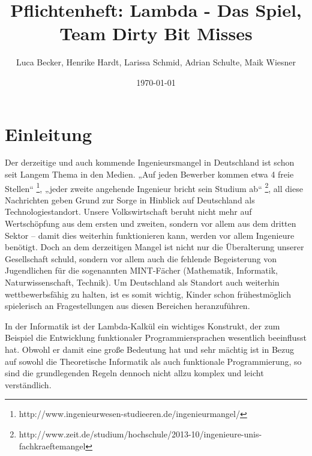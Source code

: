 \documentclass{scrartcl}
\begin{document}
\begin{titlepage}

\title{Pflichtenheft: Lambda - Das Spiel, Team Dirty Bit Misses}
\author{Luca Becker, Henrike Hardt, Larissa Schmid, Adrian Schulte, Maik Wiesner}
\date{\today}

\maketitle
\thispagestyle{empty}

\end{titlepage}

\clearpage

\tableofcontents
\thispagestyle{empty}

\clearpage
\setcounter{page}{1}

\section{Einleitung}

Der derzeitige und auch kommende Ingenieursmangel in Deutschland ist
schon seit Langem Thema in den Medien. „Auf jeden Bewerber kommen
etwa 4 freie Stellen“%
\footnote{http://www.ingenieurwesen-studieeren.de/ingenieurmangel/%
}, „jeder zweite angehende Ingenieur bricht sein Studium ab“%
\footnote{http://www.zeit.de/studium/hochschule/2013-10/ingenieure-unis-fachkraeftemangel%
}, all diese Nachrichten geben Grund zur Sorge in Hinblick auf Deutschland
als Technologiestandort. Unsere Volkswirtschaft beruht nicht mehr
auf Wertschöpfung aus dem ersten und zweiten, sondern vor allem aus
dem dritten Sektor – damit dies weiterhin funktionieren kann, werden
vor allem Ingenieure benötigt. Doch an dem derzeitigen Mangel ist
nicht nur die Überalterung unserer Gesellschaft schuld, sondern vor
allem auch die fehlende Begeisterung von Jugendlichen für die sogenannten
MINT-Fächer (Mathematik, Informatik, Naturwissenschaft, Technik).
Um Deutschland als Standort auch weiterhin wettbewerbsfähig zu halten,
ist es somit wichtig, Kinder schon frühestmöglich spielerisch an Fragestellungen
aus diesen Bereichen heranzuführen. 

In der Informatik ist der Lambda-Kalkül ein wichtiges Konstrukt, der
zum Beispiel die Entwicklung funktionaler Programmiersprachen wesentlich
beeinflusst hat. Obwohl er damit eine große Bedeutung hat und sehr
mächtig ist in Bezug auf sowohl die Theoretische Informatik als auch
funktionale Programmierung, so sind die grundlegenden Regeln dennoch
nicht allzu komplex und leicht verständlich. 
\end{document}
